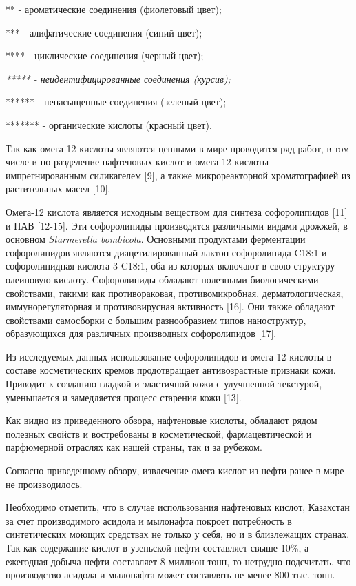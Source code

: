 ** - ароматические соединения (фиолетовый цвет);

*** - алифатические соединения (синий цвет);

**** - циклические соединения (черный цвет);

\emph{***** - неидентифицированные соединения (курсив);}

****** - ненасыщенные соединения (зеленый цвет);

******* - органические кислоты (красный цвет).

Так как омега-12 кислоты являются ценными в мире проводится ряд работ, в
том числе и по разделение нафтеновых кислот и омега-12 кислоты
импрегнированным силикагелем {[}9{]}, а также микрореакторной
хроматографией из растительных масел {[}10{]}.

Омега-12 кислота является исходным веществом для синтеза софоролипидов
{[}11{]} и ПАВ {[}12-15{]}. Эти софоролипиды производятся различными
видами дрожжей, в основном \emph{Starmerella bombicola}. Основными
продуктами ферментации софоролипидов являются диацетилированный лактон
софоролипида C18:1 и софоролипидная кислота 3 C18:1, оба из которых
включают в свою структуру олеиновую кислоту. Софоролипиды обладают
полезными биологическими свойствами, такими как противораковая,
противомикробная, дерматологическая, иммунорегуляторная и
противовирусная активность {[}16{]}. Они также обладают свойствами
самосборки с большим разнообразием типов наноструктур, образующихся для
различных производных софоролипидов {[}17{]}.

Из исследуемых данных использование софоролипидов и омега-12 кислоты в
составе косметических кремов продотвращает антивозрастные признаки кожи.
Приводит к созданию гладкой и эластичной кожи с улучшенной текстурой,
уменьшается и замедляется процесс старения кожи {[}13{]}.

Как видно из приведенного обзора, нафтеновые кислоты, обладают рядом
полезных свойств и востребованы в косметической, фармацевтической и
парфюмерной отраслях как нашей страны, так и за рубежом.

Согласно приведенному обзору, извлечение омега кислот из нефти ранее в
мире не производилось.

Необходимо отметить, что в случае использования нафтеновых кислот,
Казахстан за счет производимого асидола и мылонафта покроет потребность
в синтетических моющих средствах не только у себя, но и в близлежащих
странах. Так как содержание кислот в узеньской нефти составляет свыше
10\%, а ежегодная добыча нефти составляет 8 миллион тонн, то нетрудно
подсчитать, что производство асидола и мылонафта может составлять не
менее 800 тыс. тонн.

